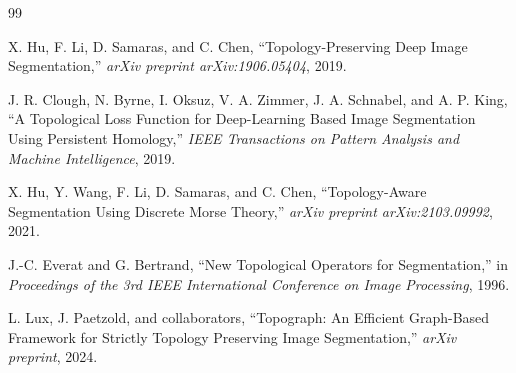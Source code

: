 \documentclass[conference]{IEEEtran}
\begin{document}
\begin{thebibliography}{99}

X. Hu, F. Li, D. Samaras, and C. Chen, 
``Topology-Preserving Deep Image Segmentation,'' 
\emph{arXiv preprint arXiv:1906.05404}, 2019.

J. R. Clough, N. Byrne, I. Oksuz, V. A. Zimmer, J. A. Schnabel, and A. P. King, 
``A Topological Loss Function for Deep-Learning Based Image Segmentation Using Persistent Homology,'' 
\emph{IEEE Transactions on Pattern Analysis and Machine Intelligence}, 2019.

X. Hu, Y. Wang, F. Li, D. Samaras, and C. Chen, 
``Topology-Aware Segmentation Using Discrete Morse Theory,'' 
\emph{arXiv preprint arXiv:2103.09992}, 2021.

J.-C. Everat and G. Bertrand, 
``New Topological Operators for Segmentation,'' 
in \emph{Proceedings of the 3rd IEEE International Conference on Image Processing}, 1996.

L. Lux, J. Paetzold, and collaborators, 
``Topograph: An Efficient Graph-Based Framework for Strictly Topology Preserving Image Segmentation,'' 
\emph{arXiv preprint}, 2024.

\end{thebibliography}
\end{document}
